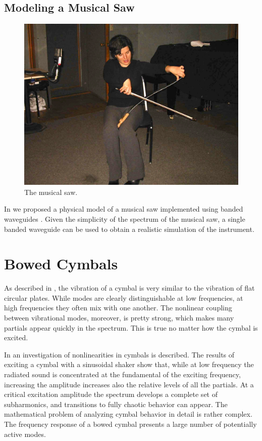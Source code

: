 \subsection{Modeling a Musical Saw}
\begin{figure}[t]
\centering
\includegraphics[width=\textwidth]{sawperf.jpg}
\caption{The musical saw.}
  \label{Serafin:fig:sawperf}
\end{figure}

In \cite{Serafin:2002} we proposed a physical model of a musical saw implemented using banded waveguides \cite{Essl:1999}. Given the simplicity of the spectrum of the musical saw, a single banded waveguide can be used to obtain a realistic simulation of the instrument.

\section{Bowed Cymbals}

As described in  \cite{Serafin:2004}, the vibration of a cymbal is very similar to the vibration of flat circular plates. While modes are clearly distinguishable at low frequencies, at high frequencies they often mix with one another. The nonlinear coupling between vibrational modes, moreover, is pretty strong, which makes many partials appear quickly in the spectrum. This is true no matter how the cymbal is excited.

In  \cite{Serafin:2004} an investigation of nonlinearities in cymbals is described. The results of exciting a cymbal with a sinusoidal shaker show that, while at low frequency the radiated sound is concentrated at the fundamental of the exciting frequency, increasing the amplitude increases also the relative levels of all the partials. At a critical excitation amplitude the spectrum develops a complete set of subharmonics, and transitions to fully chaotic behavior can appear. The mathematical problem of analyzing cymbal behavior in detail is rather complex. The frequency response of a bowed cymbal presents a large number of potentially active modes.

